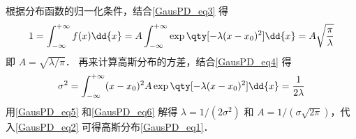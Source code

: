 根据分布函数的归一化条件，结合\autoref{GausPD_eq3} 得
\begin{equation}\label{GausPD_eq5}
1 = \int_{-\infty}^{+\infty} f(x) \dd{x}  = A\int_{-\infty}^{+\infty} \exp\qty[-\lambda (x - x_0)^2] \dd{x}  = A\sqrt{\frac{\pi}{\lambda}}
\end{equation}
即 $A = \sqrt{\lambda/\pi}$． 再来计算高斯分布的方差，结合\autoref{GausPD_eq4} 得
\begin{equation}\label{GausPD_eq6}
\sigma ^2 = \int_{-\infty}^{+\infty} (x - x_0)^2 A\exp\qty[-\lambda (x - x_0)^2] \dd{x}  = \frac{1}{2\lambda}
\end{equation}
用\autoref{GausPD_eq5} 和\autoref{GausPD_eq6} 解得 $\lambda = 1/(2\sigma^2)$ 和 $A = 1/(\sigma\sqrt{2\pi})$，代入\autoref{GausPD_eq2} 可得高斯分布\autoref{GausPD_eq1}．